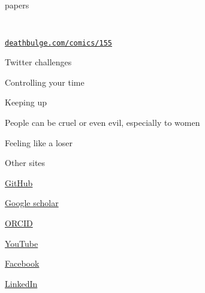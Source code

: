 \documentclass[12pt,t,aspectratio=169]{beamer}
\begin{document}
\begin{frame}[c]{papers}


  \begin{columns}[c]
    \begin{column}{0.5\textwidth}
      \href{https://twitter.com/kwbroman/status/433417315862867969}{}
    \end{column}

    \begin{column}{0.5\textwidth}

    \end{column}

  \end{columns}


\end{frame}






\begin{frame}{}

\vspace{8mm}

\centerline{
    \href{http://www.deathbulge.com/comics/155}{}
}

\vspace{7mm}
\hfill \href{http://www.deathbulge.com/comics/155}{\lolit \footnotesize \tt deathbulge.com/comics/155}

\end{frame}


\begin{frame}[c]{Twitter challenges}

  \bbi
\item Controlling your time
\item Keeping up
\item People can be cruel or even evil, {\hilit especially to women}
\item Feeling like a loser
    \ei

\end{frame}


\begin{frame}[c]{Other sites}

\bbi
\item \href{https://github.com}{GitHub}
\item \href{https://scholar.google.com}{Google scholar}
\item \href{https://orcid.org}{ORCID}
\item \href{https://youtube.com}{YouTube}
\item \href{https://facebook.com}{\lolit Facebook}
\item \href{https://linkedin.com}{\lolit LinkedIn}
\ei

\end{frame}
\end{document}

